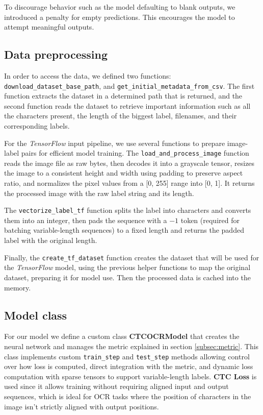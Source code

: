 \documentclass[11pt,letterpaper]{article}
\begin{document}
	To discourage behavior such as the model defaulting to blank outputs, we introduced a penalty for empty predictions. This encourages the model to attempt meaningful outputs.
	
	\subsection{Data preprocessing}
	In order to access the data, we defined two functions: \texttt{download\_dataset\_base\_path}, and \texttt{get\_initial\-\_metadata\_from\_csv}. The first function extracts the dataset in a determined path that is returned, and the second function reads the dataset to retrieve important information such as all the characters present, the length of the biggest label, filenames, and their corresponding labels.
	
	For the \textit{TensorFlow} input pipeline, we use several functions to prepare image-label pairs for efficient model training. The \texttt{load\_and\_process\_image} function reads the image file as raw bytes, then decodes it into a grayscale tensor, resizes the image to a consistent height and width using padding to preserve aspect ratio, and normalizes the pixel values from a [0, 255] range into [0, 1]. It returns the processed image with the raw label string and its length. 
	
	The \texttt{vectorize\_label\_tf} function splits the label into characters and converts them into an integer, then pads the sequence with a $-1$ token (required for batching variable-length sequences) to a fixed length and returns the padded label with the original length.
	
	Finally, the \texttt{create\_tf\_dataset} function creates the dataset that will be used for the \textit{TensorFlow} model, using the previous helper functions to map the original dataset, preparing it for model use. Then the processed data is cached into the memory.
	
	\subsection{Model class} \label{subsec:model_class}
	For our model we define a custom class \textbf{CTCOCRModel} that creates the neural network and manages the metric explained in section \ref{subsec:metric}. This class implements custom \texttt{train\_step} and \texttt{test\_step} methods allowing control over how loss is computed, direct integration with the metric, and dynamic loss computation with sparse tensors to support variable-length labels. \textbf{CTC Loss} is used since it allows training without requiring aligned input and output sequences, which is ideal for OCR tasks where the position of characters in the image isn't strictly aligned with output positions.
	
\end{document}
